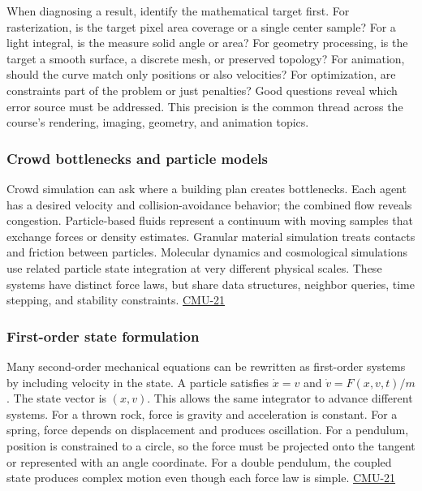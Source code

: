 When diagnosing a result, identify the mathematical target first. For rasterization, is the target pixel area coverage or a single center sample? For a light integral, is the measure solid angle or area? For geometry processing, is the target a smooth surface, a discrete mesh, or preserved topology? For animation, should the curve match only positions or also velocities? For optimization, are constraints part of the problem or just penalties? Good questions reveal which error source must be addressed. This precision is the common thread across the course's rendering, imaging, geometry, and animation topics.

\subsubsection{Crowd bottlenecks and particle models}\label{crowd-bottlenecks-and-particle-models}

Crowd simulation can ask where a building plan creates bottlenecks. Each agent has a desired velocity and collision-avoidance behavior; the combined flow reveals congestion. Particle-based fluids represent a continuum with moving samples that exchange forces or density estimates. Granular material simulation treats contacts and friction between particles. Molecular dynamics and cosmological simulations use related particle state integration at very different physical scales. These systems have distinct force laws, but share data structures, neighbor queries, time stepping, and stability constraints. \hyperref[04-visual-computing-ii-ch036]{CMU-21}

\subsubsection{First-order state formulation}\label{first-order-state-formulation}

Many second-order mechanical equations can be rewritten as first-order systems by including velocity in the state. A particle satisfies \(\dot x=v\) and \(\dot v=F(x,v,t)/m\). The state vector is \((x,v)\). This allows the same integrator to advance different systems. For a thrown rock, force is gravity and acceleration is constant. For a spring, force depends on displacement and produces oscillation. For a pendulum, position is constrained to a circle, so the force must be projected onto the tangent or represented with an angle coordinate. For a double pendulum, the coupled state produces complex motion even though each force law is simple. \hyperref[04-visual-computing-ii-ch036]{CMU-21}

